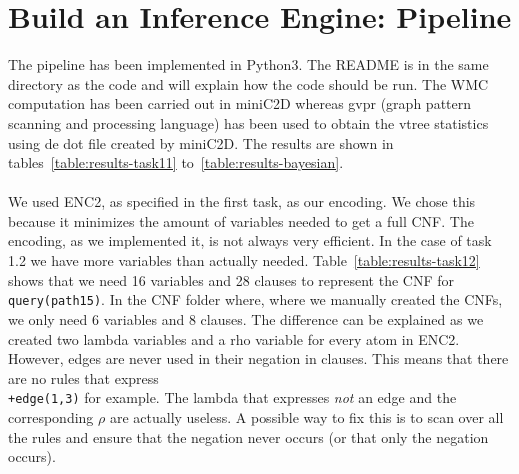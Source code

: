 \section{Build an Inference Engine: Pipeline}

The pipeline has been implemented in Python3. The README is in the same directory as the code and will explain how the code should be run. The WMC computation has been carried out in miniC2D whereas gvpr (graph pattern scanning and processing language) has been used to obtain the vtree statistics using de dot file created by miniC2D. The results are shown in tables~\ref{table:results-task11} to~\ref{table:results-bayesian}.
\\\\
We used ENC2, as specified in the first task, as our encoding. We chose this because it minimizes the amount of variables needed to get a full CNF. The encoding, as we implemented it, is not always very efficient. In the case of task 1.2 we have more variables than actually needed. Table~\ref{table:results-task12} shows that we need 16 variables and 28 clauses to represent the CNF for \texttt{query(path15)}. In the CNF folder where, where we manually created the CNFs, we only need 6 variables and 8 clauses. The difference can be explained as we created two lambda variables and a rho variable for every atom in ENC2. However, edges are never used in their negation in clauses. This means that there are no rules that express \texttt{\\+edge(1,3)} for example. The lambda that expresses \textit{not} an edge and the corresponding $\rho$ are actually useless. A possible way to fix this is to scan over all the rules and ensure that the negation never occurs (or that only the negation occurs).

\begin{table}[h]
\centering
\caption{Results task11}
\label{table:results-task11}
\end{table}



